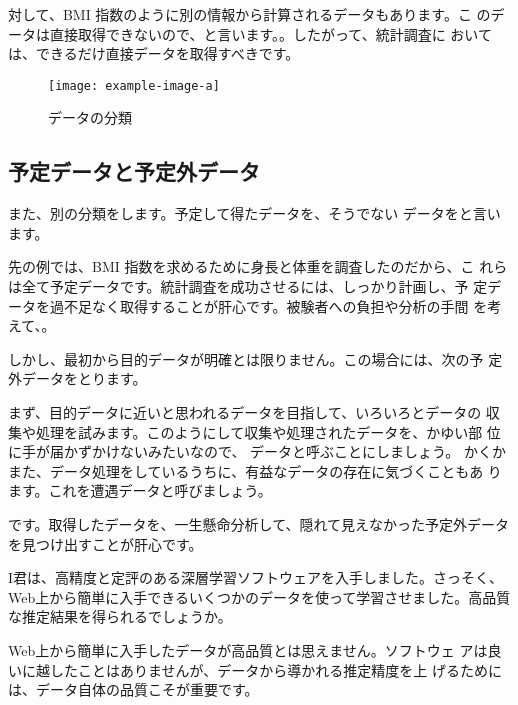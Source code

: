 対して、BMI 指数のように別の情報から計算されるデータもあります。こ のデータは直接取得できないので、と言います。。したがって、統計調査に おいては、できるだけ直接データを取得すべきです。

\begin{figure}[h]
    \centering
    \texttt{[image: example-image-a]}
    \caption{データの分類\label{fig:category}}
\end{figure}

\subsection{予定データと予定外データ}
また、別の分類をします。予定して得たデータを、そうでない データをと言います。

先の例では、BMI 指数を求めるために身長と体重を調査したのだから、こ れらは全て予定データです。統計調査を成功させるには、しっかり計画し、予 定データを過不足なく取得することが肝心です。被験者への負担や分析の手間 を考えて、。

しかし、最初から目的データが明確とは限りません。この場合には、次の予 定外データをとります。

まず、目的データに近いと思われるデータを目指して、いろいろとデータの 収集や処理を試みます。このようにして収集や処理されたデータを、かゆい部 位に手が届かずかけないみたいなので、 データと呼ぶことにしましょう。 かくか また、データ処理をしているうちに、有益なデータの存在に気づくこともあ ります。これを遭遇データと呼びましょう。

です。取得したデータを、一生懸命分析して、隠れて見えなかった予定外データを見つけ出すことが肝心です。

\begin{simQ}
    I君は、高精度と定評のある深層学習ソフトウェアを入手しました。さっそく、Web上から簡単に入手できるいくつかのデータを使って学習させました。高品質な推定結果を得られるでしょうか。
\end{simQ}

\begin{simA}
    Web上から簡単に入手したデータが高品質とは思えません。ソフトウェ アは良いに越したことはありませんが、データから導かれる推定精度を上 げるためには、データ自体の品質こそが重要です。
\end{simA}

